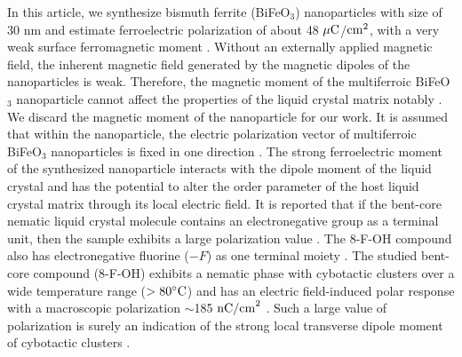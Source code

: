 \documentclass[reprint,amsfonts,amsmath,amssymb,aps,pre,floatfix,10pt]{revtex4-1}
\begin{document}
In this article, we synthesize bismuth ferrite (BiFeO$_3$) nanoparticles with size of 30 nm and estimate ferroelectric polarization of about 48 $\mu {\rm C}$/${\rm cm}^2$, with a very weak surface ferromagnetic moment \cite{castillo2013effect_20, Dhananjoy2023dielectric_21, selbach2007size_22, karpinsky2017thermodynamic_23}. Without an externally applied magnetic field, the inherent magnetic field generated by the magnetic dipoles of the nanoparticles is weak.  
Therefore, the magnetic moment of the multiferroic BiFeO$_3$ nanoparticle cannot affect the properties of the liquid crystal matrix notably \cite{reznikov2017ferromagnetic_24, emdadi2018behaviour_25, emdadi2018investigation_26}. We discard the magnetic moment of the nanoparticle for our work. It is assumed that within the nanoparticle, the electric polarization vector of multiferroic BiFeO$_3$ nanoparticles is fixed in one direction \cite{emdadi2018investigation_26}. The strong ferroelectric moment of the synthesized nanoparticle interacts with the dipole moment of the liquid crystal and has the potential to alter the order parameter of the host liquid crystal matrix through its local electric field.  It is reported that if the bent-core nematic liquid crystal molecule contains an electronegative group as a terminal unit, then the sample exhibits a large polarization value  \cite{mohiuddin2017observation_28,hiremath2016supramolecular_29}. The 8-F-OH compound also has electronegative fluorine ($-F$) as one terminal moiety \cite{zhang2022electric_27}. The studied bent-core compound (8-F-OH) exhibits a nematic phase with cybotactic clusters over a wide temperature range ($> 80 ^\circ {\rm C} $) and has an electric field-induced polar response with a macroscopic polarization $\sim$185 ${\rm nC/cm}^2$ \cite{zhang2022electric_27, kaur2023polar}. Such a large value of polarization is surely an indication of the strong local transverse dipole moment of cybotactic clusters \cite{ghosh2014ferroelectric_4, kumar2018nanodoping_12, vita2018polar_30}.
\end{document}
